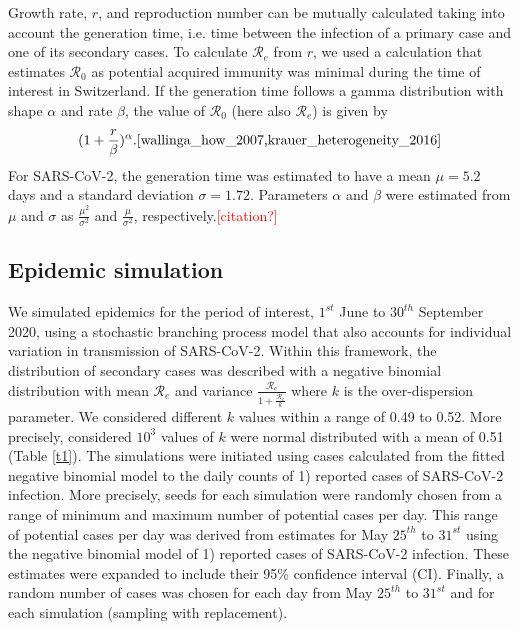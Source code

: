 \documentclass[10pt, a4paper, twoside]{article}
\begin{document}
\begin{multicols}{2}
Growth rate, $r$, and reproduction number can be mutually calculated taking into account the generation time, i.e. time between the infection of a primary case and one of its secondary cases.\cite{svensson_note_2007}
To calculate $\mathcal{R}_e$ from $r$, we used a calculation that estimates $\mathcal{R}_0$ as potential acquired immunity was minimal during the time of interest in Switzerland.
If the generation time follows a gamma distribution with shape $\alpha$ and rate $\beta$, the value of $\mathcal{R}_0$ (here also $\mathcal{R}_e$) is given by \[ (1 + \frac{r}{\beta} )^\alpha.\cite{wallinga_how_2007,krauer_heterogeneity_2016} \]
For SARS-CoV-2, the generation time was estimated to have a mean $\mu= 5.2$ days and a standard deviation $\sigma = 1.72$.\cite{ganyani_estimating_2020}
Parameters $\alpha$ and $\beta$ were estimated from $\mu$ and $\sigma$ as $\frac{\mu^2}{\sigma^2 }$ and $\frac{\mu}{\sigma^2}$, respectively.\textcolor{red}{[citation?]}

\subsection{Epidemic simulation}

We simulated epidemics for the period of interest, $1^{st}$ June to $30^{th}$ September 2020, using a stochastic branching process model that also accounts for individual variation in transmission of SARS-CoV-2.
Within this framework, the distribution of secondary cases was described with a negative binomial distribution with mean $\mathcal{R}_e$ and variance $\frac{\mathcal{R}_e}{1+\frac{\mathcal{R}_e}{k}}$ where $k$ is the over-dispersion parameter. 
We considered different $k$ values within a range of 0.49 to 0.52.\cite{laxminarayan_epidemiology_2020}
More precisely, considered $10^3$ values of $k$ were normal distributed with a mean of 0.51 (Table \ref{t1}).
The simulations were initiated using cases calculated from the fitted negative binomial model to the daily counts of 1) reported cases of SARS-CoV-2 infection.
More precisely, seeds for each simulation were randomly chosen from a range of minimum and maximum number of potential cases per day. 
This range of potential cases per day was derived from estimates for May $25^{th}$ to $31^{st}$ using the negative binomial model of 1) reported cases of SARS-CoV-2 infection. 
These estimates were expanded to include their 95\% confidence interval (CI). 
Finally, a random number of cases was chosen for each day from May $25^{th}$ to $31^{st}$ and for each simulation (sampling with replacement). 


\end{multicols}
\end{document}
